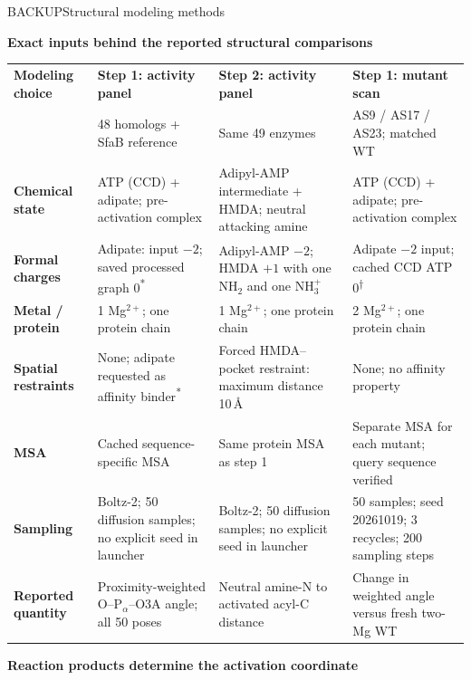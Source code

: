 \documentclass{article}
\begin{document}
{\fontsize{14}{17}\selectfont\color{muted} BACKUP\quad Structural modeling methods}\par\vspace{5pt}
{\fontsize{27}{31}\selectfont\bfseries\color{maroon} Exact inputs behind the reported structural comparisons}\par
\vspace{7pt}
\fontsize{14.7}{17.2}\selectfont
\begin{tabularx}{\textwidth}{@{}>{\raggedright\arraybackslash}p{1.35in}YYY@{}}
\toprule
\textbf{Modeling choice} & \textbf{Step 1: activity panel} & \textbf{Step 2: activity panel} & \textbf{Step 1: mutant scan}\\
 & 48 homologs + SfaB reference & Same 49 enzymes & AS9 / AS17 / AS23; matched WT\\
\midrule
\textbf{Chemical state} & ATP (CCD) + adipate; pre-activation complex & Adipyl-AMP intermediate + HMDA; neutral attacking amine & ATP (CCD) + adipate; pre-activation complex\\
\textbf{Formal charges} & Adipate: input $-2$; saved processed graph $0$\textsuperscript{*} & Adipyl-AMP $-2$; HMDA $+1$ with one NH$_2$ and one NH$_3^+$ & Adipate $-2$ input; cached CCD ATP $0$\textsuperscript{\ensuremath{\dagger}}\\
\textbf{Metal / protein} & 1 Mg$^{2+}$; one protein chain & 1 Mg$^{2+}$; one protein chain & 2 Mg$^{2+}$; one protein chain\\
\textbf{Spatial restraints} & None; adipate requested as affinity binder\textsuperscript{*} & Forced HMDA--pocket restraint: maximum distance 10\,\AA & None; no affinity property\\
\textbf{MSA} & Cached sequence-specific MSA & Same protein MSA as step 1 & Separate MSA for each mutant; query sequence verified\\
\textbf{Sampling} & Boltz-2; 50 diffusion samples; no explicit seed in launcher & Boltz-2; 50 diffusion samples; no explicit seed in launcher & 50 samples; seed 20261019; 3 recycles; 200 sampling steps\\
\textbf{Reported quantity} & Proximity-weighted O--P$_\alpha$--O3A angle; all 50 poses & Neutral amine-N to activated acyl-C distance & Change in weighted angle versus fresh two-Mg WT\\
\bottomrule
\end{tabularx}
\vspace{10pt}
{\fontsize{16}{19}\selectfont\bfseries Reaction products determine the activation coordinate}\par\vspace{5pt}
\end{document}
